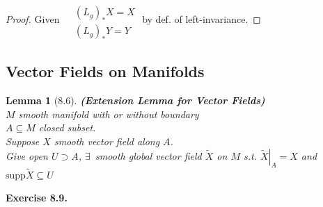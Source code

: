 \documentclass[11pt]{amsart}
\newtheorem{lemma}{Lemma}
\theoremstyle{definition}
\newcommand{\exercisehead}[1]{\medskip\noindent\textbf{Exercise #1.} }
\begin{document}
\begin{proof}
  Given $\begin{aligned} & \quad \\ & (L_g)_*X = X \\ & (L_g)_* Y = Y \end{aligned}$ by def. of left-invariance.
\end{proof}









\subsection*{Vector Fields on Manifolds}

\begin{lemma}[8.6] \textbf{(Extension Lemma for Vector Fields)} \\
  $M$ smooth manifold with or without boundary \\
$A \subseteq M$ closed subset. \\
Suppose $X$ smooth vector field along $A$.  \\
Give open $U \supset A$, $\exists \, $ smooth global vector field $\widetilde{X}$ on $M$ s.t. $\left. \widetilde{X} \right|_A = X$ and $\text{supp}{\widetilde{X}} \subseteq U$
\end{lemma}

\exercisehead{8.9}
\end{document}

